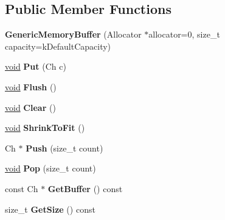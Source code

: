 \subsection*{Public Member Functions}
\begin{DoxyCompactItemize}
\item 
\hypertarget{struct_generic_memory_buffer_ad08f7da47bca43fcdb0c3b10e22dfa1d}{}{\bfseries Generic\+Memory\+Buffer} (Allocator $\ast$allocator=0, size\+\_\+t capacity=k\+Default\+Capacity)\label{struct_generic_memory_buffer_ad08f7da47bca43fcdb0c3b10e22dfa1d}

\item 
\hypertarget{struct_generic_memory_buffer_a9dfb477983e211893601f8ab637b42d8}{}\hyperlink{_s_d_l__audio_8h_a52835ae37c4bb905b903cbaf5d04b05f}{void} {\bfseries Put} (Ch c)\label{struct_generic_memory_buffer_a9dfb477983e211893601f8ab637b42d8}

\item 
\hypertarget{struct_generic_memory_buffer_a9861181cab6f5bec2ec08b601aa53575}{}\hyperlink{_s_d_l__audio_8h_a52835ae37c4bb905b903cbaf5d04b05f}{void} {\bfseries Flush} ()\label{struct_generic_memory_buffer_a9861181cab6f5bec2ec08b601aa53575}

\item 
\hypertarget{struct_generic_memory_buffer_a036cbe2556778e1edc525602a9821df2}{}\hyperlink{_s_d_l__audio_8h_a52835ae37c4bb905b903cbaf5d04b05f}{void} {\bfseries Clear} ()\label{struct_generic_memory_buffer_a036cbe2556778e1edc525602a9821df2}

\item 
\hypertarget{struct_generic_memory_buffer_a3b87deb9bf34c394c8fb262ab53c0c4b}{}\hyperlink{_s_d_l__audio_8h_a52835ae37c4bb905b903cbaf5d04b05f}{void} {\bfseries Shrink\+To\+Fit} ()\label{struct_generic_memory_buffer_a3b87deb9bf34c394c8fb262ab53c0c4b}

\item 
\hypertarget{struct_generic_memory_buffer_a56f7b14d2940b682fe592f598d6792ec}{}Ch $\ast$ {\bfseries Push} (size\+\_\+t count)\label{struct_generic_memory_buffer_a56f7b14d2940b682fe592f598d6792ec}

\item 
\hypertarget{struct_generic_memory_buffer_a82a6706286f1356e1769282f5d496005}{}\hyperlink{_s_d_l__audio_8h_a52835ae37c4bb905b903cbaf5d04b05f}{void} {\bfseries Pop} (size\+\_\+t count)\label{struct_generic_memory_buffer_a82a6706286f1356e1769282f5d496005}

\item 
\hypertarget{struct_generic_memory_buffer_a9afc78eef159fcbc10d0cea84ccfb26d}{}const Ch $\ast$ {\bfseries Get\+Buffer} () const \label{struct_generic_memory_buffer_a9afc78eef159fcbc10d0cea84ccfb26d}

\item 
\hypertarget{struct_generic_memory_buffer_adc22f10318fa6dbdf7eb1fa9041bb68d}{}size\+\_\+t {\bfseries Get\+Size} () const \label{struct_generic_memory_buffer_adc22f10318fa6dbdf7eb1fa9041bb68d}

\end{DoxyCompactItemize}
